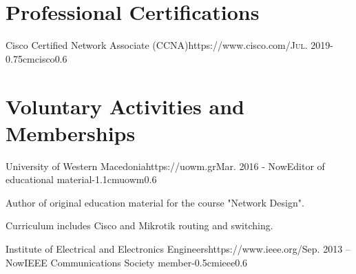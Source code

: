 \documentclass{mycv}
\begin{document}
	\vspace{-0.25cm}
	\section{Professional Certifications}
	\begin{EntryDatedLogo}{Cisco Certified Network Associate (CCNA)}{https://www.cisco.com/}{\scshape{Jul. 2019}}{}{-0.75cm}{cisco}{0.6}
	\end{EntryDatedLogo}
	\vspace{0.25cm}
	
	\section{Voluntary Activities and Memberships}
	\vspace*{0.125cm}	
	\begin{EntryDatedLogo}{University of Western Macedonia}{https://uowm.gr}{Mar. 2016 - Now}{Editor of educational material}{-1.1cm}{uowm}{0.6}
	\begin{Itemize}
		\item Author of original education material for the course "Network Design".
		\item Curriculum includes Cisco and Mikrotik routing and switching.
	\end{Itemize}
	\end{EntryDatedLogo}

	\vspace*{0.5cm}
	
	\begin{EntryDatedLogo}{Institute of Electrical and Electronics Engineers}{https://www.ieee.org/}{Sep. 2013 -- Now}{IEEE Communications Society member}{-0.5cm}{ieee}{0.6}
	\end{EntryDatedLogo}
\end{document}
